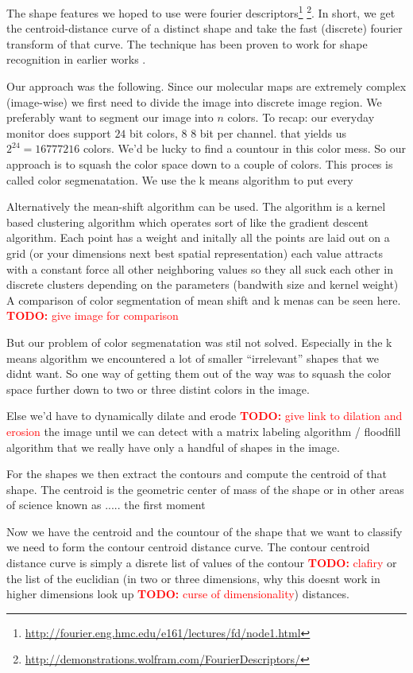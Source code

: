 \documentclass[journal]{vgtc}       %
\newcommand{\todo}[1]{\textcolor{red}{\textbf{TODO:} #1}}
\begin{document}
The shape features we hoped to use were  fourier descriptors\footnote{\url{http://fourier.eng.hmc.edu/e161/lectures/fd/node1.html} } \footnote{\url{http://demonstrations.wolfram.com/FourierDescriptors/}}. In short, we get the centroid-distance curve of a distinct shape and take the fast (discrete) fourier transform of that curve. The technique has been proven to work for shape recognition  in earlier works \cite{fourierd}.

Our approach was the following.  Since our molecular maps are extremely complex (image-wise) we first need to divide the image into discrete image region.  We preferably want to segment our image into $n$ colors. To recap: our everyday monitor does support \(24\) bit colors, \(8 \) 8 bit per channel. that yields us \(2^{24}=16777216 \) colors.
We'd be lucky to find a countour in this color mess.
So our approach is to squash the color space down to a couple of colors.
This proces is called color segmenatation. We use the k means algorithm to put every 

Alternatively the mean-shift algorithm can be used. The algorithm is a kernel based clustering algorithm which operates sort of like the gradient descent algorithm.
Each point has a weight and initally all the points are laid out on a grid (or your dimensions next best spatial representation) each value attracts with a constant force all other neighboring values so they all suck each other in discrete clusters depending on the parameters (bandwith size and kernel weight) A comparison of color segmentation of mean shift and  k menas can be seen here. \todo{give image for comparison}

But our problem of color segmenatation was stil not solved. Especially in the k means algorithm we encountered a lot of smaller ``irrelevant'' shapes that we didnt want.
So one way of getting them out of the way was to squash the color space further down to two or three distint colors in the image.

Else we'd have to dynamically dilate and erode \todo{give link to dilation and erosion} the image until we can detect with a matrix labeling algorithm /  floodfill algorithm that we really have only a handful of shapes in the image.

For the shapes we then extract the contours and compute the centroid of that shape.
The centroid is the geometric center of mass of the shape or in other areas of science known as ..... the first moment 

Now we have the centroid and the countour of the shape that we want to classify we need to form the contour centroid distance curve.
The contour centroid distance curve is simply a disrete list of values of the contour \todo{clafiry} or the list of the euclidian (in two or three dimensions, why this doesnt work in higher dimensions look up \todo{curse of dimensionality}) distances.
\end{document}
